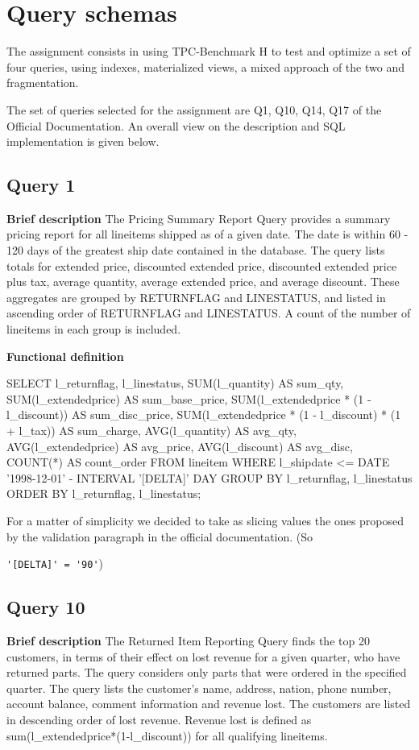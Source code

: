 
\section{Query schemas}

The assignment consists in using TPC-Benchmark H to test and optimize a set of four queries, using indexes, materialized views, a mixed approach of the two and fragmentation.

The set of queries selected for the assignment are Q1, Q10, Q14, Q17 of the Official Documentation. An overall view on the description and SQL implementation is given below.

\subsection{Query 1}
\textbf{Brief description}
The Pricing Summary Report Query provides a summary pricing report for all lineitems shipped as of a given date.
The date is within 60 - 120 days of the greatest ship date contained in the database. The query lists totals for
extended price, discounted extended price, discounted extended price plus tax, average quantity, average extended
price, and average discount. These aggregates are grouped by RETURNFLAG and LINESTATUS, and listed in
ascending order of RETURNFLAG and LINESTATUS. A count of the number of lineitems in each group is
included.

\textbf{Functional definition}
\begin{sql}[ ]
SELECT
    l_returnflag,
    l_linestatus,
    SUM(l_quantity) AS sum_qty,
    SUM(l_extendedprice) AS sum_base_price,
    SUM(l_extendedprice * (1 - l_discount)) AS sum_disc_price,
    SUM(l_extendedprice * (1 - l_discount) * (1 + l_tax)) AS sum_charge,
    AVG(l_quantity) AS avg_qty,
    AVG(l_extendedprice) AS avg_price,
    AVG(l_discount) AS avg_disc,
    COUNT(*) AS count_order
FROM
    lineitem
WHERE
    l_shipdate <= DATE '1998-12-01' - INTERVAL '[DELTA]' DAY
GROUP BY
    l_returnflag,
    l_linestatus
ORDER BY
    l_returnflag,
    l_linestatus;
\end{sql}

For a matter of simplicity we decided to take as slicing values the ones proposed by the validation paragraph in the official documentation. (So

\verb|'[DELTA]' = '90'|)

\subsection{Query 10}
\textbf{Brief description}
The Returned Item Reporting Query finds the top 20 customers, in terms of their effect on lost revenue for a given
quarter, who have returned parts. The query considers only parts that were ordered in the specified quarter. The
query lists the customer's name, address, nation, phone number, account balance, comment information and revenue
lost. The customers are listed in descending order of lost revenue. Revenue lost is defined as
sum(l\_extendedprice*(1-l\_discount)) for all qualifying lineitems.

